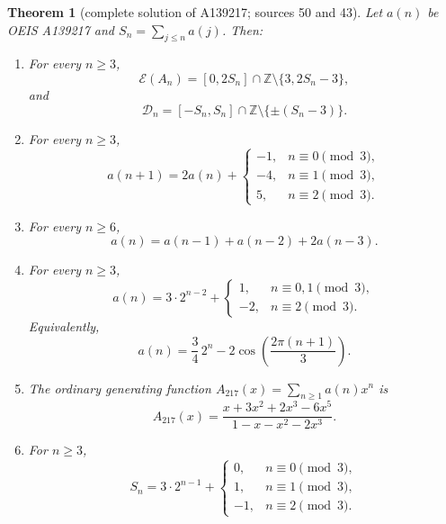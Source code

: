 \documentclass[11pt,a4paper]{article}
\numberwithin{equation}{section}
\newtheorem{theorem}{Theorem}[section]
\theoremstyle{definition}
\theoremstyle{remark}
\theoremstyle{plain}
\newcommand{\Z}{\mathbb Z}
\newcommand{\cD}{\mathcal D}
\newcommand{\cE}{\mathcal E}
\begin{document}
\begin{theorem}[complete solution of A139217; sources 50 and 43]\label{gdf:thm:A139217}
Let $a(n)$ be OEIS A139217 and $S_n=\sum_{j\le n}a(j)$.  Then:
\begin{enumerate}[label=(\alph*)]
\item For every $n\ge3$,
\[
 \cE(A_n)=[0,2S_n]\cap\Z\setminus\{3,2S_n-3\},
\]
and
\[
 \cD_n=[-S_n,S_n]\cap\Z\setminus\{\pm(S_n-3)\}.
\]
\item For every $n\ge3$,
\begin{equation}\label{gdf:eq:217-first-order}
 a(n+1)=2a(n)+
 \begin{cases}
 -1,&n\equiv0\pmod3,\\
 -4,&n\equiv1\pmod3,\\
 5,&n\equiv2\pmod3.
 \end{cases}
\end{equation}
\item For every $n\ge6$,
\begin{equation}\label{gdf:eq:217-recurrence}
 a(n)=a(n-1)+a(n-2)+2a(n-3).
\end{equation}
\item For every $n\ge3$,
\begin{equation}\label{gdf:eq:217-closed}
 a(n)=3\cdot2^{n-2}+
 \begin{cases}
 1,&n\equiv0,1\pmod3,\\
 -2,&n\equiv2\pmod3.
 \end{cases}
\end{equation}
Equivalently,
\begin{equation}\label{gdf:eq:217-cosine}
 a(n)=\frac34\,2^n-2\cos\left(\frac{2\pi(n+1)}3\right).
\end{equation}
\item The ordinary generating function $A_{217}(x)=\sum_{n\ge1}a(n)x^n$ is
\begin{equation}\label{gdf:eq:217-ogf}
 A_{217}(x)=
 \frac{x+3x^2+2x^3-6x^5}{1-x-x^2-2x^3}.
\end{equation}
\item For $n\ge3$,
\begin{equation}\label{gdf:eq:217-S}
 S_n=3\cdot2^{n-1}+
 \begin{cases}
 0,&n\equiv0\pmod3,\\
 1,&n\equiv1\pmod3,\\
 -1,&n\equiv2\pmod3.
 \end{cases}
\end{equation}
\end{enumerate}
\end{theorem}
\end{document}
